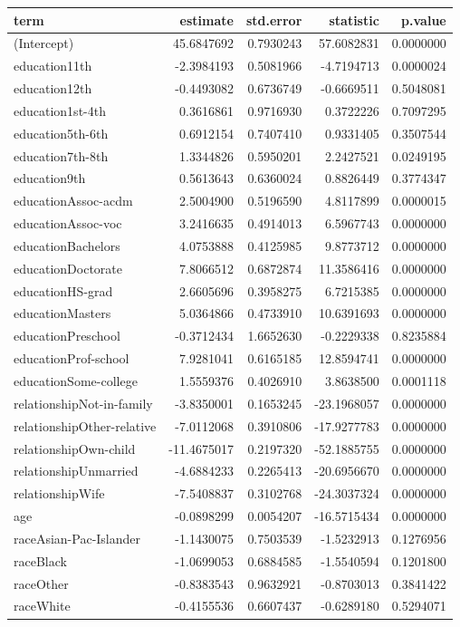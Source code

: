 \documentclass[]{article}
\begin{document}
\begin{table}[H]
\centering
\begin{tabular}{l|r|r|r|r}
\hline
term & estimate & std.error & statistic & p.value\\
\hline
(Intercept) & 45.6847692 & 0.7930243 & 57.6082831 & 0.0000000\\
\hline
education11th & -2.3984193 & 0.5081966 & -4.7194713 & 0.0000024\\
\hline
education12th & -0.4493082 & 0.6736749 & -0.6669511 & 0.5048081\\
\hline
education1st-4th & 0.3616861 & 0.9716930 & 0.3722226 & 0.7097295\\
\hline
education5th-6th & 0.6912154 & 0.7407410 & 0.9331405 & 0.3507544\\
\hline
education7th-8th & 1.3344826 & 0.5950201 & 2.2427521 & 0.0249195\\
\hline
education9th & 0.5613643 & 0.6360024 & 0.8826449 & 0.3774347\\
\hline
educationAssoc-acdm & 2.5004900 & 0.5196590 & 4.8117899 & 0.0000015\\
\hline
educationAssoc-voc & 3.2416635 & 0.4914013 & 6.5967743 & 0.0000000\\
\hline
educationBachelors & 4.0753888 & 0.4125985 & 9.8773712 & 0.0000000\\
\hline
educationDoctorate & 7.8066512 & 0.6872874 & 11.3586416 & 0.0000000\\
\hline
educationHS-grad & 2.6605696 & 0.3958275 & 6.7215385 & 0.0000000\\
\hline
educationMasters & 5.0364866 & 0.4733910 & 10.6391693 & 0.0000000\\
\hline
educationPreschool & -0.3712434 & 1.6652630 & -0.2229338 & 0.8235884\\
\hline
educationProf-school & 7.9281041 & 0.6165185 & 12.8594741 & 0.0000000\\
\hline
educationSome-college & 1.5559376 & 0.4026910 & 3.8638500 & 0.0001118\\
\hline
relationshipNot-in-family & -3.8350001 & 0.1653245 & -23.1968057 & 0.0000000\\
\hline
relationshipOther-relative & -7.0112068 & 0.3910806 & -17.9277783 & 0.0000000\\
\hline
relationshipOwn-child & -11.4675017 & 0.2197320 & -52.1885755 & 0.0000000\\
\hline
relationshipUnmarried & -4.6884233 & 0.2265413 & -20.6956670 & 0.0000000\\
\hline
relationshipWife & -7.5408837 & 0.3102768 & -24.3037324 & 0.0000000\\
\hline
age & -0.0898299 & 0.0054207 & -16.5715434 & 0.0000000\\
\hline
raceAsian-Pac-Islander & -1.1430075 & 0.7503539 & -1.5232913 & 0.1276956\\
\hline
raceBlack & -1.0699053 & 0.6884585 & -1.5540594 & 0.1201800\\
\hline
raceOther & -0.8383543 & 0.9632921 & -0.8703013 & 0.3841422\\
\hline
raceWhite & -0.4155536 & 0.6607437 & -0.6289180 & 0.5294071\\
\hline
\end{tabular}
\end{table}
\end{document}
